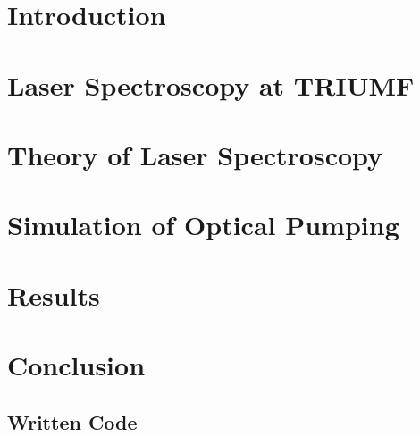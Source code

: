 \documentclass[12pt,Bold,letterpaper,TexShade]{mcgilletdclass}
\begin{document}
\chapter{Introduction}
\label{Intro}


\chapter{Laser Spectroscopy at TRIUMF}
\label{Lspec}


\chapter{Theory of Laser Spectroscopy}
\label{theory}


\chapter{Simulation of Optical Pumping}
\label{Op_pump}


\chapter{Results}
\label{res}


\chapter{Conclusion}
\label{conc}



\begin{appendices}
\chapter{Written Code}
\label{code}

\end{appendices}


\end{document}
